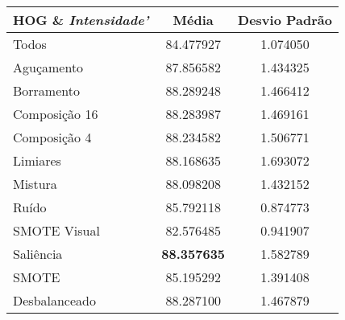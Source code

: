 

\begin{table}[!htbp]
\centering
\caption{}
\label{tab:resultados:x:melhor}
\begin{tabular}{|l|c|c|}
\hline
\textbf{HOG \& \emph{Intensidade'}} & \textbf{Média}     & \textbf{Desvio Padrão} \\ \hline
   Todos        & 84.477927  & 1.074050  \\ \hline
  Aguçamento    & 87.856582  & 1.434325  \\ \hline
  Borramento    & 88.289248  & 1.466412  \\ \hline
  Composição 16 & 88.283987  & 1.469161  \\ \hline
  Composição 4  & 88.234582  & 1.506771  \\ \hline
  Limiares      & 88.168635  & 1.693072  \\ \hline
  Mistura       & 88.098208  & 1.432152  \\ \hline
  Ruído         & 85.792118  & 0.874773  \\ \hline
  SMOTE Visual  & 82.576485  & 0.941907  \\ \hline
  Saliência     & \textbf{88.357635}  & 1.582789  \\ \hline
 SMOTE          & 85.195292  & 1.391408  \\ \hline
Desbalanceado   & 88.287100  & 1.467879  \\ \hline
\end{tabular}
\end{table}

